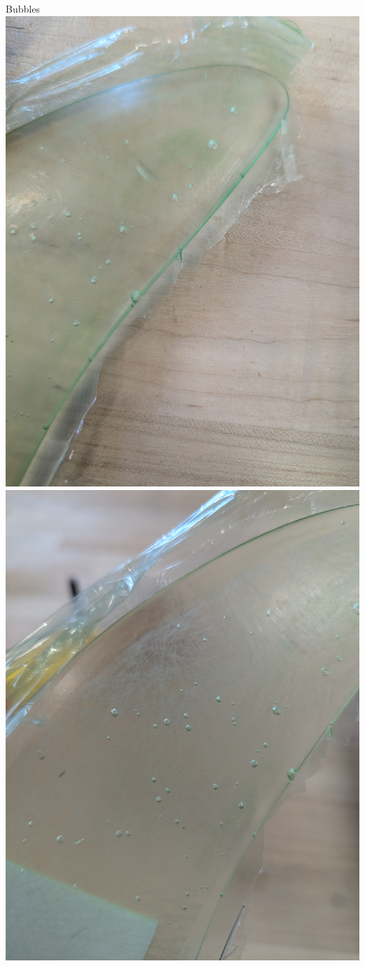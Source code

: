 \begin{frame}{Bubbles}
    \includegraphics[height=0.5\textheight,keepaspectratio]{images/sf_tip_bubbles.jpg}
    \includegraphics[height=0.5\textheight,keepaspectratio]{images/sf_tip_bubbles_2.jpg}

\end{frame}
